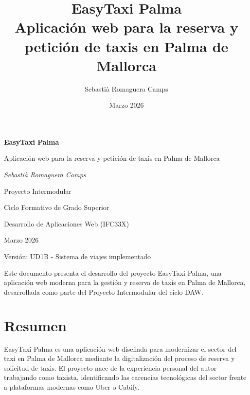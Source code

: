 \documentclass[12pt,a4paper]{article}
\title{\textbf{EasyTaxi Palma} \\ \large Aplicación web para la reserva y petición de taxis en Palma de Mallorca}
\author{Sebastià Romaguera Camps}
\date{Marzo 2026}
\begin{document}
\begin{titlepage}
    \centering
    \vspace*{2cm}
    
    {\Huge\bfseries EasyTaxi Palma\par}
    \vspace{1cm}
    {\Large Aplicación web para la reserva y petición de taxis en Palma de Mallorca\par}
    \vspace{2cm}
    
    {\large\itshape Sebastià Romaguera Camps\par}
    \vspace{1cm}
    
    {\large Proyecto Intermodular\par}
    {\large Ciclo Formativo de Grado Superior\par}
    {\large Desarrollo de Aplicaciones Web (IFC33X)\par}
    \vspace{2cm}
    
    {\large Marzo 2026\par}
    \vspace{1cm}
    
    {\normalsize Versión: UD1B - Sistema de viajes implementado\par}
    
    \vfill
    
    {\small Este documento presenta el desarrollo del proyecto EasyTaxi Palma, una aplicación web moderna para la gestión y reserva de taxis en Palma de Mallorca, desarrollada como parte del Proyecto Intermodular del ciclo DAW.\par}
    
\end{titlepage}

\newpage
\tableofcontents
\newpage

\section*{Resumen}

EasyTaxi Palma es una aplicación web diseñada para modernizar el sector del taxi en Palma de Mallorca mediante la digitalización del proceso de reserva y solicitud de taxis. El proyecto nace de la experiencia personal del autor trabajando como taxista, identificando las carencias tecnológicas del sector frente a plataformas modernas como Uber o Cabify.
\end{document}

